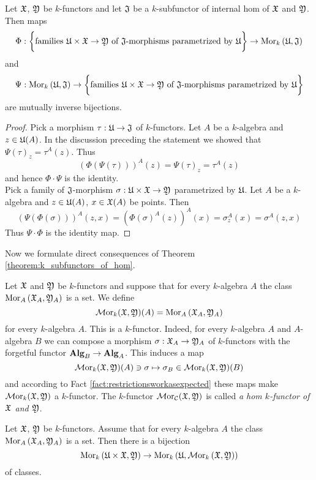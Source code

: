 \begin{theorem}\label{theorem:k_subfunctors_of_hom}
Let ${\mathfrak X}$, ${\mathfrak Y}$ be $k$-functors and let ${\mathfrak J}$ be a $k$-subfunctor of internal hom of ${\mathfrak X}$ and ${\mathfrak Y}$. Then maps 
$$\Phi:\bigg\{\mbox{families }{\mathfrak U}\times {\mathfrak X}\rightarrow {\mathfrak Y}\mbox{ of }{\mathfrak J}\mbox{-morphisms parametrized by }{\mathfrak U}\bigg\} \rightarrow  \mathrm{Mor}_{k}\left({\mathfrak U},{\mathfrak J}\right)$$
and
$$\Psi:\mathrm{Mor}_{k}\left({\mathfrak U},{\mathfrak J}\right) \rightarrow \bigg\{\mbox{families }{\mathfrak U}\times {\mathfrak X}\rightarrow {\mathfrak Y}\mbox{ of }{\mathfrak J}\mbox{-morphisms parametrized by }{\mathfrak U}\bigg\}$$
are mutually inverse bijections.
\end{theorem}
\begin{proof}
Pick a morphism $\tau:{\mathfrak U}\rightarrow {\mathfrak J}$ of $k$-functors. Let $A$ be a $k$-algebra and $z\in {\mathfrak U}(A)$. In the discussion preceding the statement we showed that $\Psi(\tau)_z = \tau^A(z)$. Thus
$$\left(\Phi(\Psi(\tau))\right)^A(z) = \Psi(\tau)_z = \tau^A(z)$$
and hence $\Phi\cdot \Psi$ is the identity.\\
Pick a family of ${\mathfrak J}$-morphism $\sigma:{\mathfrak U}\times {\mathfrak X}\rightarrow {\mathfrak Y}$ parametrized by ${\mathfrak U}$. Let $A$ be a $k$-algebra and $z\in {\mathfrak U}(A)$, $x\in {\mathfrak X}(A)$ be points. Then
$$\left(\Psi\left(\Phi(\sigma)\right)\right)^A(z,x) = \left(\Phi(\sigma)^A(z)\right)^A(x) = \sigma_z^A(x) = \sigma^A(z,x)$$
Thus $\Psi\cdot \Phi$ is the identity map.
\end{proof}
\noindent
Now we formulate direct consequences of Theorem \ref{theorem:k_subfunctors_of_hom}.

\begin{definition}
Let ${\mathfrak X}$ and ${\mathfrak Y}$ be $k$-functors and suppose that for every $k$-algebra $A$ the class $\mathrm{Mor}_A\left({\mathfrak X}_A,{\mathfrak Y}_A\right)$ is a set. We define
$$\mathcal{M}\mathrm{or}_k({\mathfrak X},{\mathfrak Y})(A)=\mathrm{Mor}_A\left({\mathfrak X}_A,{\mathfrak Y}_A\right)$$
for every $k$-algebra $A$. This is a $k$-functor. Indeed, for every $k$-algebra $A$ and $A$-algebra $B$ we can compose a morphism $\sigma:{\mathfrak X}_A\rightarrow {\mathfrak Y}_A$ of $k$-functors with the forgetful functor $\mathbf{Alg}_B \rightarrow \mathbf{Alg}_A$. This induces a map 
$$\mathcal{M}\mathrm{or}_{k}({\mathfrak X},{\mathfrak Y})(A)\ni \sigma \mapsto \sigma_{B}\in \mathcal{M}\mathrm{or}_{k}({\mathfrak X},{\mathfrak Y})(B)$$
and according to Fact \ref{fact:restrictionsworkasexpected} these maps make $\mathcal{M}\mathrm{or}_{k}({\mathfrak X},{\mathfrak Y})$ a $k$-functor. The $k$-functor $\mathcal{M}\mathrm{or}_{{\mathcal C}}({\mathfrak X},{\mathfrak Y})$ is called \textit{a hom $k$-functor of ${\mathfrak X}$ and ${\mathfrak Y}$}.
\end{definition}

\begin{corollary}\label{corollary:hom_k_functors}
Let ${\mathfrak X}$, ${\mathfrak Y}$ be $k$-functors. Assume that for every $k$-algebra $A$ the class $\mathrm{Mor}_{A}\left({\mathfrak X}_A,{\mathfrak Y}_A\right)$ is a set. Then there is a bijection 
$$\mathrm{Mor}_{k}\left({\mathfrak U}\times {\mathfrak X},{\mathfrak Y}\right)\rightarrow  \mathrm{Mor}_{k}\left({\mathfrak U},\mathcal{M}\mathrm{or}_{k}\left({\mathfrak X},{\mathfrak Y}\right)\right)$$
of classes.
\end{corollary}

